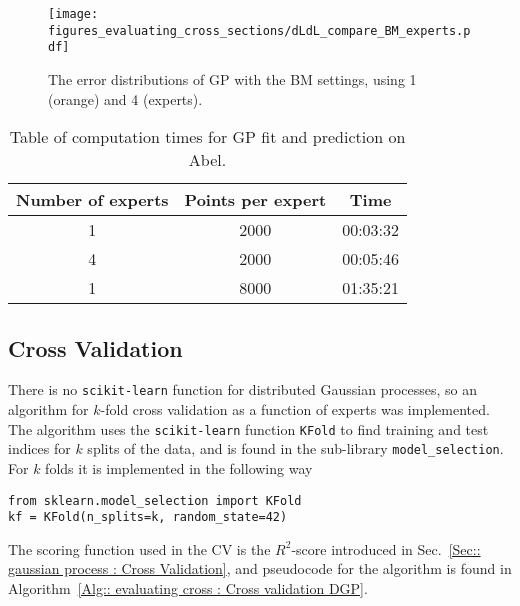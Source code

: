 \documentclass[twoside,english]{uiofysmaster}
\begin{document}
{\begin{figure}
\centering
\texttt{[image: figures\_evaluating\_cross\_sections/dLdL\_compare\_BM\_experts.pdf]}
\caption{The error distributions of GP with the BM settings, using 1 (orange) and 4 (experts).}
\label{Fig:: evaluating cross : compare 1 vs 4 expert dLdL}
\end{figure}  

\begin{table}
\centering
\begin{tabular}{@{}ccc@{}} \toprule
Number of experts & Points per expert & Time\\
\midrule
1 & 2000 & 00:03:32\\
4 & 2000 & 00:05:46\\
1 & 8000 & 01:35:21\\ \bottomrule
\end{tabular}
\caption{Table of computation times for GP fit and prediction on Abel.}
\label{Tab:: evaluating cross : computation times experts BM}
\end{table}


\subsection{Cross Validation}

There is no \verb|scikit-learn| function for distributed Gaussian processes, so an algorithm for $k$-fold cross validation as a function of experts was implemented. The algorithm uses the \verb|scikit-learn| function \verb|KFold| to find training and test indices for $k$ splits of the data, and is found in the sub-library \verb|model_selection|. For $k$ folds it is implemented in the following way
\begin{lstlisting}
from sklearn.model_selection import KFold
kf = KFold(n_splits=k, random_state=42)
\end{lstlisting}
The scoring function used in the CV is the $R^2$-score introduced in Sec.~\ref{Sec:: gaussian process : Cross Validation}, and pseudocode for the algorithm is found in Algorithm~\ref{Alg:: evaluating cross : Cross validation DGP}. 



}
\end{document}
